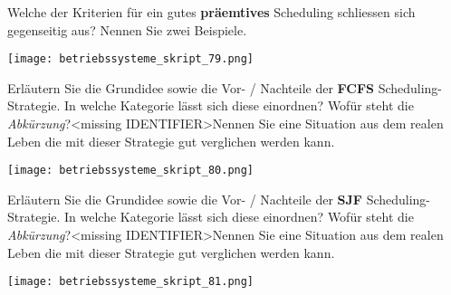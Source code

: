 \documentclass{article}
\begin{document}
\begin{tcolorbox}[colback=white!10!white,colframe=lightgray!75!black,
  savelowerto=\jobname_ex.tex,breakable,enhanced,lines before break=40]

\justifying
Welche der Kriterien für ein gutes \textbf{präemtives} Scheduling schliessen sich gegenseitig aus? Nennen Sie zwei Beispiele.

\tcblower

\justifying
\begin{center}
\texttt{[image: betriebssysteme\_skript\_79.png]}
\end{center}

\end{tcolorbox}
\begin{tcolorbox}[colback=white!10!white,colframe=lightgray!75!black,
  savelowerto=\jobname_ex.tex,breakable,enhanced,lines before break=40]

\justifying
Erläutern Sie die Grundidee sowie die Vor- / Nachteile der \textbf{FCFS} Scheduling-Strategie. In welche Kategorie lässt sich diese einordnen? Wofür steht die \textit{Abkürzung}?<missing IDENTIFIER>Nennen Sie eine Situation aus dem realen Leben die mit dieser Strategie gut verglichen werden kann.

\tcblower

\justifying
\begin{center}
\texttt{[image: betriebssysteme\_skript\_80.png]}
\end{center}

\end{tcolorbox}
\begin{tcolorbox}[colback=white!10!white,colframe=lightgray!75!black,
  savelowerto=\jobname_ex.tex,breakable,enhanced,lines before break=40]

\justifying
Erläutern Sie die Grundidee sowie die Vor- / Nachteile der \textbf{SJF} Scheduling-Strategie. In welche Kategorie lässt sich diese einordnen? Wofür steht die \textit{Abkürzung}?<missing IDENTIFIER>Nennen Sie eine Situation aus dem realen Leben die mit dieser Strategie gut verglichen werden kann.

\tcblower

\justifying
\begin{center}
\texttt{[image: betriebssysteme\_skript\_81.png]}
\end{center}

\end{tcolorbox}
\end{document}

